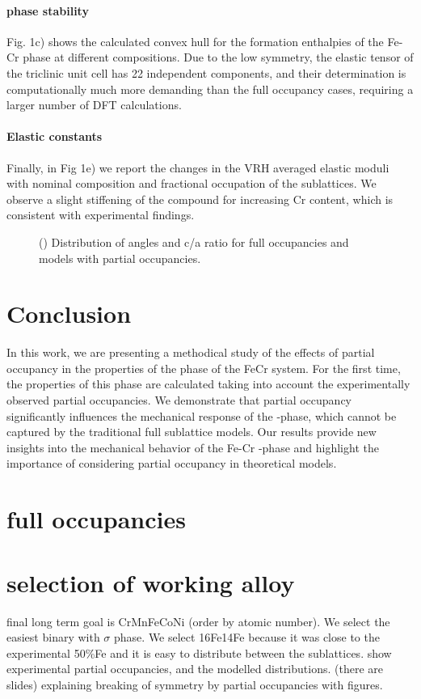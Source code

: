 \documentclass[superscriptaddress, 12pt]{revtex4-2}%
\begin{document}
\paragraph{phase stability}

Fig. 1c) shows the calculated convex hull for the formation enthalpies of the Fe-Cr \textsigma phase at different compositions.
Due to the low symmetry, the elastic tensor of the triclinic unit cell has 22 independent components, and their determination is computationally much more demanding than the full occupancy cases, requiring a larger number of DFT calculations.

\paragraph{Elastic constants}

Finally, in Fig 1e) we report the changes in the VRH averaged elastic moduli with nominal composition and fractional occupation of the sublattices.
We observe a slight stiffening of the compound for increasing Cr content, which is consistent with experimental findings.

\begin{figure}
  \caption{\protect\label{fig:SymmetryConsiderations}
    () 
    Distribution of angles and c/a ratio for full occupancies and models with partial occupancies. 
  }
\end{figure}
\section{Conclusion}
In this work, we are presenting a methodical study of the effects of partial occupancy in the properties of the \textsigma phase of the FeCr system.
For the first time, the properties of this phase are calculated taking into account the experimentally observed partial occupancies.
We demonstrate that partial occupancy significantly influences the mechanical response of the \textsigma-phase, which cannot be captured by the traditional full sublattice models.
Our results provide new insights into the mechanical behavior of the Fe-Cr \textsigma-phase and highlight the importance of considering partial occupancy in theoretical models.


\section{full occupancies}

\section{selection of working alloy}
final long term goal is CrMnFeCoNi (order by atomic number).
We select the easiest binary with $\sigma$ phase.
We select 16Fe14Fe because it was close to the experimental 50\%Fe and it is easy to distribute between the sublattices.
show experimental partial occupancies, and the modelled distributions.
(there are slides)
explaining breaking of symmetry by partial occupancies with figures.


 
\end{document}
